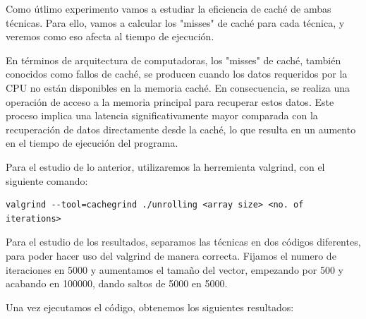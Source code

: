 \documentclass[a4paper,twocolumn]{article}
\begin{document}
Como útlimo experimento vamos a estudiar la eficiencia de caché de ambas técnicas. Para ello, vamos a calcular los "misses" de caché para cada técnica, y veremos como eso afecta al tiempo de ejecución.

En términos de arquitectura de computadoras, los "misses" de caché, también conocidos como fallos de caché, se producen cuando los datos requeridos por la CPU no están disponibles en la memoria caché. En consecuencia, se realiza una operación de acceso a la memoria principal para recuperar estos datos. Este proceso implica una latencia significativamente mayor comparada con la recuperación de datos directamente desde la caché, lo que resulta en un aumento en el tiempo de ejecución del programa.

Para el estudio de lo anterior, utilizaremos la herremienta valgrind, con el siguiente comando:

\begin{lstlisting}[caption={Comando para ejecutar valgrind},label={lst:codigoC}]
    valgrind --tool=cachegrind ./unrolling <array size> <no. of iterations>
\end{lstlisting}

Para el estudio de los resultados, separamos las técnicas en dos códigos diferentes, para poder hacer uso del valgrind de manera correcta. Fijamos el numero de iteraciones en 5000 y aumentamos el tamaño del vector, empezando por 500 y acabando en 100000, dando saltos de 5000 en 5000. 

Una vez ejecutamos el código, obtenemos los siguientes resultados:
\end{document}
